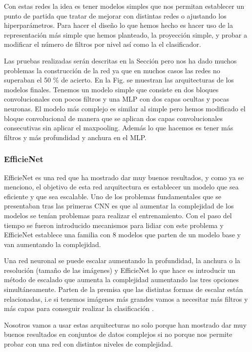 \documentclass[a4paper,12pt,twoside,titlepage]{article}
\begin{document}
Con estas redes la idea es tener modelos simples que nos permitan establecer un punto de partida que tratar de mejorar con distintas redes o ajustando los hiperparámetros. Para hacer el diseño lo que hemos hecho es hacer uso de la representación más simple que hemos planteado, la proyección simple, y probar a modificar el número de filtros por nivel así como la el clasificador.

Las pruebas realizadas serán descritas en la Sección  pero nos ha dado muchos problemas la construcción de la red ya que en muchos casos las redes no superaban el 50 \% de acierto. En la Fig. se muestran las arquitecturas de los modelos finales. Tenemos un modelo simple que consiste en dos bloques convolucionales con pocos filtros y una MLP con dos capas ocultas y pocas neuronas. El modelo más complejo es similar al simple pero hemos modificado el bloque convolucional de manera que se aplican dos capas convolucionales consecutivas sin aplicar el maxpooling. Además lo que hacemos es tener más filtros y más profundidad y anchura en el MLP.

\subsubsection*{EfficieNet}

EfficieNet \cite{} es una red que ha mostrado dar muy buenos resultados, y como ya se menciono, el objetivo de esta red arquitectura es establecer un modelo que sea eficiente y que sea escalable. Uno de los problemas fundamentales que se presentaban tras las primeras CNN es que al aumentar la complejidad de los modelos se tenían problemas para realizar el entrenamiento. Con el paso del tiempo se fueron introducido mecanismos para lidiar con este problema y EfficieNet establece una familia con 8 modelos que parten de un modelo base y van aumentando la complejidad.

Una red neuronal se puede escalar aumentando la profundidad, la anchura o la resolución (tamaño de las imágenes) y EfficieNet lo que hace es introducir un método de escalado que aumenta la complejidad aumentando las tres opciones simultáneamente. Parten de la premisa que las distintas formas de escalar están relacionadas, i.e si tenemos imágenes más grandes vamos a necesitar más filtros y más capas para conseguir realizar la clasificación \cite{}.


Nosotros vamos a usar estas arquitecturas no solo porque han mostrado dar muy buenos resultados en conjuntos de datos complejos si no porque nos permite probar con una red con distintos niveles de complejidad. 
\end{document}
